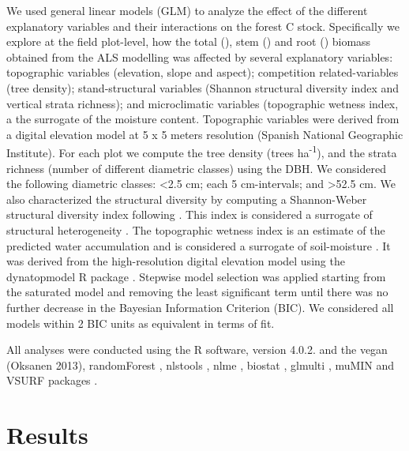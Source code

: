 We used general linear models (GLM) to analyze the effect of the different explanatory variables and their interactions on the forest C stock. Specifically we explore at the field plot-level, how the total (\wt), stem (\ws) and root (\wro) biomass obtained from the ALS modelling was affected by several explanatory variables: topographic variables (elevation, slope and aspect); competition related-variables (tree density); stand-structural variables (Shannon structural diversity index and vertical strata richness); and microclimatic variables (topographic wetness index, a the surrogate of the moisture content. Topographic variables were derived from a digital elevation model at 5 x 5 meters resolution (Spanish National Geographic Institute). For each plot we compute the tree density (trees ha\textsuperscript{-1}), and the strata richness (number of different diametric classes) using the DBH. We considered the following diametric classes: \textless2.5 cm; each 5 cm-intervals; and \textgreater52.5 cm. We also characterized the structural diversity by computing a Shannon-Weber structural diversity index following \autocite{delRioetal2003IndicesStand}. This index is considered a surrogate of structural heterogeneity \autocite{McElhinnyetal2005ForestWoodland,Gadowetal2012ForestStructure}. The topographic wetness index is an estimate of the predicted water accumulation and is considered a surrogate of soil-moisture \autocites[\emph{e.g.}][]{Zinkoetal2005PlantSpecies,Petrosellietal2013EcologicalBehavior}. It was derived from the high-resolution digital elevation model using the dynatopmodel R package \autocite{Metcalfeetal2018DynatopmodelImplementation}. Stepwise model selection was applied starting from the saturated model and removing the least significant term until there was no further decrease in the Bayesian Information Criterion (BIC). We considered all models within 2 BIC units as equivalent in terms of fit.

All analyses were conducted using the R software, version 4.0.2. \autocite{base} and the vegan (Oksanen 2013), randomForest \autocite{LiawWiener2002ClassificationRegression}, nlstools \autocite{nlstools}, nlme \autocite{Pinheiroetal2020NlmeLinear}, biostat \autocite{biostat}, glmulti \autocite{Calcagno2020GlmultiModel}, muMIN \autocite{Barton2020MuMInMultimodel} and VSURF packages \autocite{Genueretal2019VSURFVariable}. 

\section{Results}\label{sec:carbon:results}
